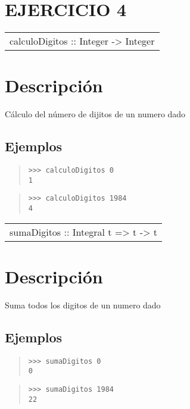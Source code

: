 \section{EJERCICIO 4}
\begin{haddockdesc}
\item[\begin{tabular}{@{}l}
calculoDigitos :: Integer -> Integer
\end{tabular}]
{\haddockbegindoc
\section*{Descripción}
Cálculo del número de dijitos de un numero dado\par
\subsection*{Ejemplos}
\begin{quote}
{\haddockverb\begin{verbatim}
>>> calculoDigitos 0
1

\end{verbatim}}
\end{quote}
\begin{quote}
{\haddockverb\begin{verbatim}
>>> calculoDigitos 1984
4

\end{verbatim}}
\end{quote}}
\end{haddockdesc}
\begin{haddockdesc}
\item[\begin{tabular}{@{}l}
sumaDigitos :: Integral t => t -> t
\end{tabular}]
{\haddockbegindoc
\section*{Descripción}
Suma todos los digitos de un numero dado\par
\subsection*{Ejemplos}
\begin{quote}
{\haddockverb\begin{verbatim}
>>> sumaDigitos 0
0

\end{verbatim}}
\end{quote}
\begin{quote}
{\haddockverb\begin{verbatim}
>>> sumaDigitos 1984
22

\end{verbatim}}
\end{quote}}
\end{haddockdesc}
